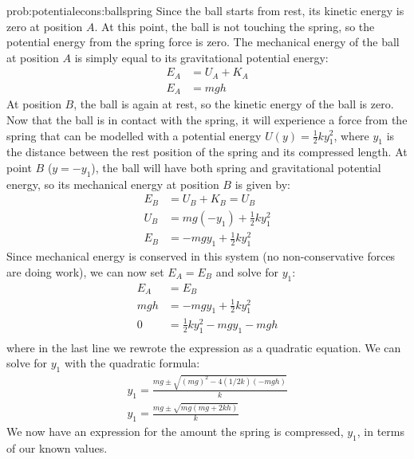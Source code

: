 \begin{solution}{prob:potentialecons:ballspring}
Since the ball starts from rest, its kinetic energy is zero at position $A$. At this point, the ball is not touching the spring, so the potential energy from the spring force is zero. The mechanical energy of the ball at position $A$ is simply equal to its gravitational potential energy:
\begin{align*}
E_A&=U_A+K_A\\
E_A&=mgh
\end{align*}
At position $B$, the ball is again at rest, so the kinetic energy of the ball is zero. Now that the ball is in contact with the spring, it will experience a force from the spring that can be modelled with a potential energy $U(y)=\frac{1}{2}ky_1^2$, where $y_1$ is the distance between the rest position of the spring and its compressed length. At point $B$ ($y=-y_1$), the ball will have both spring and gravitational potential energy, so its mechanical energy at position $B$ is given by:
\begin{align*}
E_B&=U_B+K_B=U_B\\
U_B&=mg(-y_1)+\frac{1}{2}ky_1^2\\
E_B&=-mgy_1+\frac{1}{2}ky_1^2
\end{align*}
Since mechanical energy is conserved in this system (no non-conservative forces are doing work), we can now set $E_A=E_B$ and solve for $y_1$:
\begin{align*}
E_A&=E_B\\
mgh&=-mgy_1+\frac{1}{2}ky_1^2\\
0&=\frac{1}{2}ky_1^2-mgy_1-mgh\\
\end{align*}
where in the last line we rewrote the expression as a quadratic equation. We can solve for $y_1$ with the quadratic formula:
\begin{align*}
y_1=\frac{mg\pm\sqrt{(mg)^2-4(1/2k)(-mgh)}}{k}\\
y_1=\frac{mg\pm\sqrt{mg(mg+2kh)}}{k}
\end{align*}
We now have an expression for the amount the spring is compressed, $y_1$, in terms of our known values. 
\end{solution}

